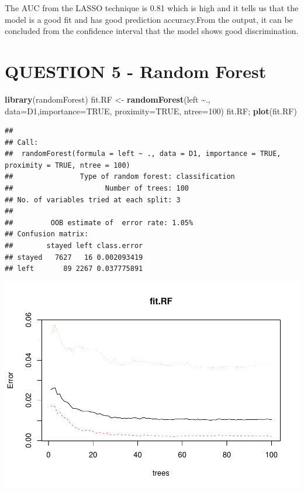 \documentclass[
  11pt,
]{article}
\newenvironment{Shaded}{\begin{snugshade}}{\end{snugshade}}
\newcommand{\AttributeTok}[1]{\textcolor[rgb]{0.13,0.29,0.53}{#1}}
\newcommand{\ConstantTok}[1]{\textcolor[rgb]{0.56,0.35,0.01}{#1}}
\newcommand{\DecValTok}[1]{\textcolor[rgb]{0.00,0.00,0.81}{#1}}
\newcommand{\FunctionTok}[1]{\textcolor[rgb]{0.13,0.29,0.53}{\textbf{#1}}}
\newcommand{\NormalTok}[1]{#1}
\newcommand{\OtherTok}[1]{\textcolor[rgb]{0.56,0.35,0.01}{#1}}
\newcommand{\SpecialCharTok}[1]{\textcolor[rgb]{0.81,0.36,0.00}{\textbf{#1}}}
\begin{document}
The AUC from the LASSO technique is 0.81 which is high and it tells us
that the model is a good fit and has good prediction accuracy.From the
output, it can be concluded from the confidence interval that the model
shows good discrimination.

\newpage
\section{QUESTION 5 - Random Forest}

\begin{Shaded}
\begin{Highlighting}[]
\FunctionTok{library}\NormalTok{(randomForest)}
\NormalTok{fit.RF }\OtherTok{\textless{}{-}} \FunctionTok{randomForest}\NormalTok{(left }\SpecialCharTok{\textasciitilde{}}\NormalTok{., }\AttributeTok{data=}\NormalTok{D1,}\AttributeTok{importance=}\ConstantTok{TRUE}\NormalTok{, }\AttributeTok{proximity=}\ConstantTok{TRUE}\NormalTok{, }\AttributeTok{ntree=}\DecValTok{100}\NormalTok{)}
\NormalTok{fit.RF; }\FunctionTok{plot}\NormalTok{(fit.RF)}
\end{Highlighting}
\end{Shaded}

\begin{verbatim}
## 
## Call:
##  randomForest(formula = left ~ ., data = D1, importance = TRUE,      proximity = TRUE, ntree = 100) 
##                Type of random forest: classification
##                      Number of trees: 100
## No. of variables tried at each split: 3
## 
##         OOB estimate of  error rate: 1.05%
## Confusion matrix:
##        stayed left class.error
## stayed   7627   16 0.002093419
## left       89 2267 0.037775891
\end{verbatim}

\includegraphics[width=0.9\linewidth]{OWUSU_project_files/figure-latex/unnamed-chunk-26-1}
\end{document}
